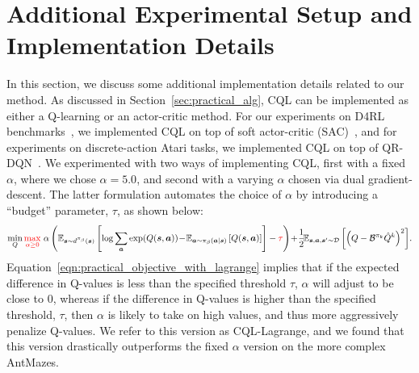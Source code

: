 
\section{Additional Experimental Setup and Implementation Details}
\label{sec:experimental_details}
In this section, we discuss some additional implementation details related to our method. As discussed in Section~\ref{sec:practical_alg}, CQL can be implemented as either a Q-learning or an actor-critic method. For our experiments on D4RL benchmarks~\citep{d4rl}, we implemented CQL on top of soft actor-critic (SAC)~\citep{haarnoja}, and for experiments on discrete-action Atari tasks, we implemented CQL on top of QR-DQN~\citep{dabney2018distributional}.
We experimented with two ways of implementing CQL, first with a fixed $\alpha$, where we chose $\alpha=5.0$, and second with a varying $\alpha$ chosen via dual gradient-descent. The latter formulation automates the choice of $\alpha$ by introducing a ``budget'' parameter, $\tau$, as shown below:
\begin{equation}
    \small{\min_{Q} \textcolor{red}{\max_{\alpha \geq 0}}~ \alpha \left( \mathbb{E}_{\boldsymbol{s}\sim d^{\pi_\beta}(\boldsymbol{s})}\left[\log \sum_{\boldsymbol{a}} \exp(Q(\boldsymbol{s}, \boldsymbol{a}))\!-\!\mathbb{E}_{\boldsymbol{a} \sim {\pi_\beta}(\boldsymbol{a}|\boldsymbol{s})}\left[Q(\boldsymbol{s}, \boldsymbol{a})\right]\right] - \textcolor{red}{\tau}\right) \!+\!\frac{1}{2}\!\mathbb{E}_{\boldsymbol{s}, \boldsymbol{a}, \boldsymbol{s}' \sim \mathcal{D}}\left[\left(Q - \mathcal{B}^{\pi_k} \hat{Q}^{k} \right)^2 \right]\!.}
    \label{eqn:practical_objective_with_lagrange}
\end{equation}
Equation~\ref{eqn:practical_objective_with_lagrange} implies that if the expected difference in Q-values is less than the specified threshold $\tau$, $\alpha$ will adjust to be close to $0$, whereas if the difference in Q-values is higher than the specified threshold, $\tau$, then $\alpha$ is likely to take on high values, and thus more aggressively penalize Q-values. We refer to this version as CQL-Lagrange, and we found that this version drastically outperforms the fixed $\alpha$ version on the more complex AntMazes. 

